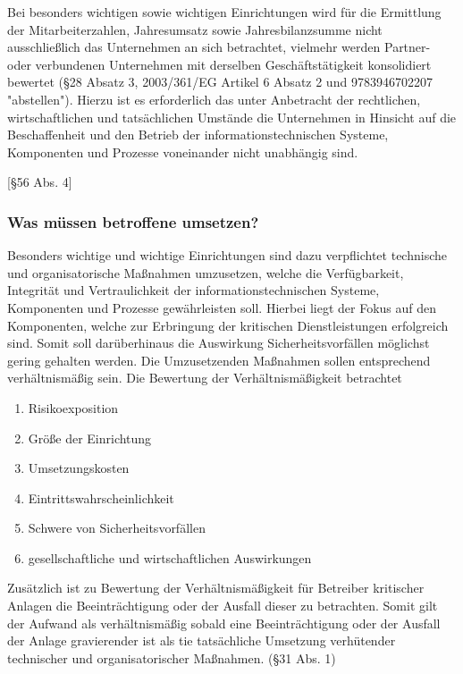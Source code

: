\documentclass[11pt,a4paper]{article}   %
\begin{document}
        Bei besonders wichtigen sowie wichtigen Einrichtungen wird für die Ermittlung der Mitarbeiterzahlen, Jahresumsatz sowie Jahresbilanzsumme nicht ausschließlich das Unternehmen an sich betrachtet, vielmehr werden Partner- oder verbundenen Unternehmen mit derselben Geschäftstätigkeit konsolidiert bewertet (§28 Absatz 3, 2003/361/EG Artikel 6 Absatz 2 und 9783946702207 "abstellen"). Hierzu ist es erforderlich das unter Anbetracht der rechtlichen, wirtschaftlichen und tatsächlichen Umstände die Unternehmen in Hinsicht auf die Beschaffenheit und den Betrieb der informationstechnischen Systeme, Komponenten und Prozesse voneinander nicht unabhängig sind.

        [§56 Abs. 4]

        \subsubsection{Was müssen betroffene umsetzen?}
        Besonders wichtige und wichtige Einrichtungen sind dazu verpflichtet technische und organisatorische Maßnahmen umzusetzen, welche die Verfügbarkeit, Integrität und Vertraulichkeit der informationstechnischen Systeme, Komponenten und Prozesse gewährleisten soll. Hierbei liegt der Fokus auf den Komponenten, welche zur Erbringung der kritischen Dienstleistungen erfolgreich sind. Somit soll darüberhinaus die Auswirkung Sicherheitsvorfällen möglichst gering gehalten werden. Die Umzusetzenden Maßnahmen sollen entsprechend verhältnismäßig sein. Die Bewertung der Verhältnismäßigkeit betrachtet
        \begin{enumerate}
            \item Risikoexposition
            \item Größe der Einrichtung
            \item Umsetzungskosten
            \item Eintrittswahrscheinlichkeit
            \item Schwere von Sicherheitsvorfällen
            \item gesellschaftliche und wirtschaftlichen Auswirkungen
        \end{enumerate}

        Zusätzlich ist zu Bewertung der Verhältnismäßigkeit für Betreiber kritischer Anlagen die Beeinträchtigung oder der Ausfall dieser zu betrachten. Somit gilt der Aufwand als verhältnismäßig sobald eine Beeinträchtigung oder der Ausfall der Anlage gravierender ist als tie tatsächliche Umsetzung verhütender technischer und organisatorischer Maßnahmen. (§31 Abs. 1)
\end{document}
